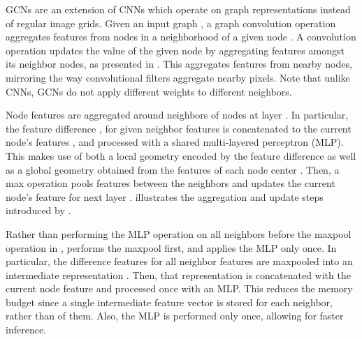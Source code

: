 \documentclass[10pt,twocolumn,letterpaper]{article}
\begin{document}
GCNs are an extension of CNNs which operate on graph representations instead of regular image grids.
Given an input graph \Gc, a graph convolution operation \Fc aggregates features from  nodes in a neighborhood  of a given node .
A convolution operation \Fc updates the value of the given node by aggregating features amongst its neighbor nodes, as presented in .
This aggregates features from nearby nodes, mirroring the way convolutional filters aggregate nearby pixels.
Note that unlike CNNs, GCNs do not apply different weights to different neighbors. 

















Node features are aggregated around neighbors  of nodes  at layer .
In particular, the feature difference , for given neighbor features  is concatenated to the current node's features , and processed with a shared multi-layered perceptron (MLP).
This makes use of both a local geometry encoded by the feature difference as well as a global geometry obtained from the features of each node center .
Then, a max operation pools features between the neighbors and updates the current node's feature  for next layer .
 illustrates the aggregation and update steps introduced by \EdgeConv.









Rather than performing the MLP operation on all neighbors before the maxpool operation in , \MRGCN performs the maxpool first, and applies the MLP only once.
In particular, the difference features  for all neighbor features  are maxpooled into an intermediate representation . 
Then, that representation is concatenated with the current node feature and processed once with an MLP.
This reduces the memory budget since a single intermediate feature vector is stored for each neighbor, rather than  of them.
Also, the MLP is performed only once, allowing for faster inference.
\end{document}
